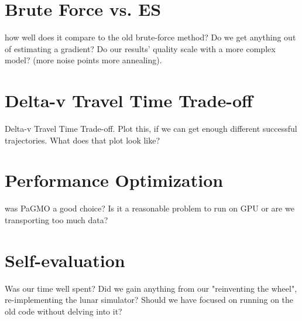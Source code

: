 


\section{Brute Force vs. ES}
how well does it compare to the old brute-force method? Do we get anything out of estimating a gradient? Do our results’ quality scale with a more complex model? (more noise points more annealing).

\section{Delta-v Travel Time Trade-off}
Delta-v Travel Time Trade-off. Plot this, if we can get enough different successful trajectories. What does that plot look like?

\section{Performance Optimization}
was PaGMO a good choice? Is it a reasonable problem to run on GPU or are we transporting too much data?

\section{Self-evaluation}
Was our time well spent? Did we gain anything from our "reinventing the wheel", re-implementing the lunar simulator? Should we have focused on running on the old code without delving into it?